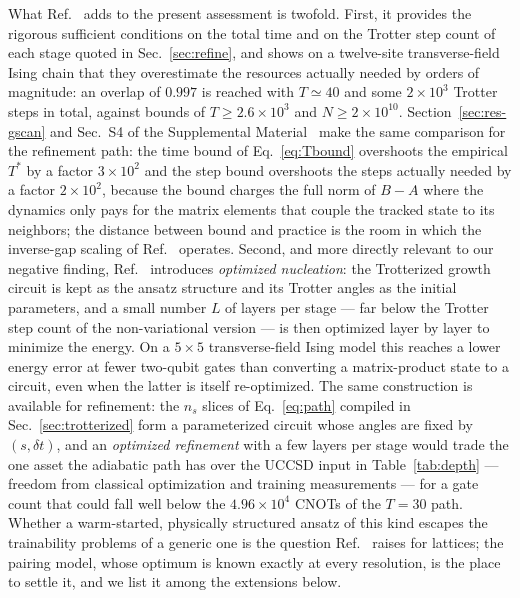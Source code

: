 \documentclass[
  aps,            %
  prc,            %
  reprint,        %
  superscriptaddress,
  floatfix,
  nofootinbib
]{revtex4-2}
\newcommand{\SM}{Supplemental Material~\cite{SM}}
\begin{document}
What Ref.~\cite{Sadia2026} adds to the present assessment is twofold.  First,
it provides the rigorous sufficient conditions on the total time and on the
Trotter step count of each stage quoted in Sec.~\ref{sec:refine}, and shows on
a twelve-site transverse-field Ising chain that they overestimate the
resources actually needed by orders of magnitude: an overlap of $0.997$ is
reached with $T\simeq40$ and some $2\times10^{3}$ Trotter steps in total,
against bounds of $T\ge2.6\times10^{3}$ and $N\ge2\times10^{10}$.  Section~\ref{sec:res-gscan} and Sec.~S4 of the \SM{} make the same comparison for the refinement
path: the time bound of Eq.~\eqref{eq:Tbound} overshoots the empirical
$T^{*}$ by a factor $3\times10^{2}$ and the step bound overshoots
the steps actually needed by a factor $2\times10^{2}$, because the bound charges the full norm of $B-A$
where the dynamics only pays for the matrix elements that couple the tracked
state to its neighbors; the distance between bound and practice is the room
in which the inverse-gap scaling of Ref.~\cite{Bogner2026} operates.  Second, and more directly
relevant to our negative finding, Ref.~\cite{Sadia2026} introduces
\emph{optimized nucleation}: the Trotterized growth circuit is kept as the
ansatz structure and its Trotter angles as the initial parameters, and a
small number $L$ of layers per stage --- far below the Trotter step count of
the non-variational version --- is then optimized layer by layer to minimize
the energy.  On a $5\times5$ transverse-field Ising model this reaches a
lower energy error at fewer two-qubit gates than converting a matrix-product
state to a circuit, even when the latter is itself re-optimized.  The same
construction is available for refinement: the $n_s$ slices of
Eq.~\eqref{eq:path} compiled in Sec.~\ref{sec:trotterized} form a
parameterized circuit whose angles are fixed by $(s,\delta t)$, and an
\emph{optimized refinement} with a few layers per stage would trade the one
asset the adiabatic path has over the UCCSD input in Table~\ref{tab:depth}
--- freedom from classical optimization and training measurements --- for a
gate count that could fall well below the $4.96\times10^{4}$ CNOTs of the
$T=30$ path.  Whether a warm-started, physically structured ansatz of this
kind escapes the trainability problems of a generic one is the question
Ref.~\cite{Sadia2026} raises for lattices; the pairing model, whose optimum
is known exactly at every resolution, is the place to settle it, and we list
it among the extensions below.
\end{document}
